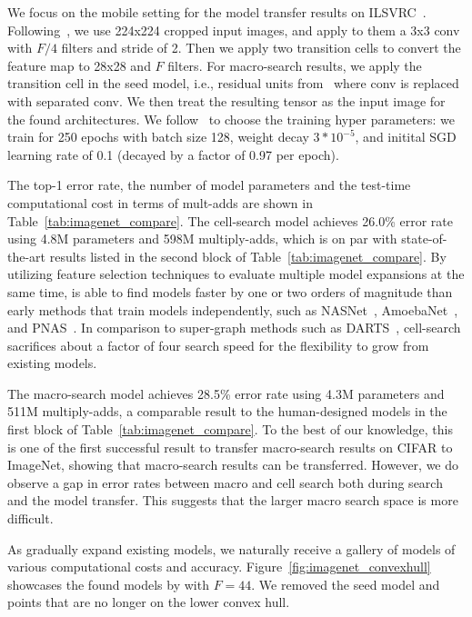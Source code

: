 We focus on the mobile setting for the model transfer results on ILSVRC~\citep{ILSVRC15}. 
Following~\citep{NASCell}, we use 224x224 cropped input images, and apply to them a 3x3 conv with $F / 4$ filters and stride of 2. Then we apply two transition cells to convert the feature map to 28x28 and $F$ filters. For macro-search results, we apply the transition cell in the seed model, i.e., residual units from~\citep{resnet} where conv is replaced with separated conv. We then treat the resulting tensor as the input image for the found architectures. 
We follow~\citep{Liu2018DARTSDA} to choose the training hyper parameters: we train for 250 epochs with batch size 128, weight decay $3*10^{-5}$, and initital SGD learning rate of 0.1 (decayed by a factor of 0.97 per epoch). 

The top-1 error rate, the number of model parameters and the test-time computational cost in terms of mult-adds are shown in Table~\ref{tab:imagenet_compare}.  The \Petridish cell-search model achieves 26.0\% error rate using 4.8M parameters and 598M multiply-adds, which is on par with state-of-the-art results listed in the second block of Table~\ref{tab:imagenet_compare}. By utilizing feature selection techniques to evaluate multiple model expansions at the same time, \Petridish is able to find models faster by one or two orders of magnitude than early methods that train models independently, such as NASNet~\citep{NASCell}, AmoebaNet~\citep{Real2018RegularizedEF}, and PNAS~\citep{Liu2017ProgressiveNA}.  
In comparison to super-graph methods such as DARTS~\citep{Liu2018DARTSDA}, \Petridish cell-search sacrifices about a factor of four search speed for the flexibility to grow from existing models. 

The \Petridish macro-search model achieves 28.5\% error rate using 4.3M parameters and 511M multiply-adds, a comparable result to the human-designed models in the first block of Table~\ref{tab:imagenet_compare}. To the best of our knowledge, this is one of the first successful result to transfer macro-search results on CIFAR to ImageNet, showing that macro-search results can be transferred. 
However, we do observe a gap in error rates between \Petridish macro and cell search both during search and the model transfer. This suggests that the larger macro search space is more difficult. 

As \Petridish gradually expand existing models, we naturally receive a gallery of models of various computational costs and accuracy. Figure~\ref{fig:imagenet_convexhull} showcases the found models by \Petridish with $F=44$. We removed the seed model and points that are no longer on the lower convex hull. 

